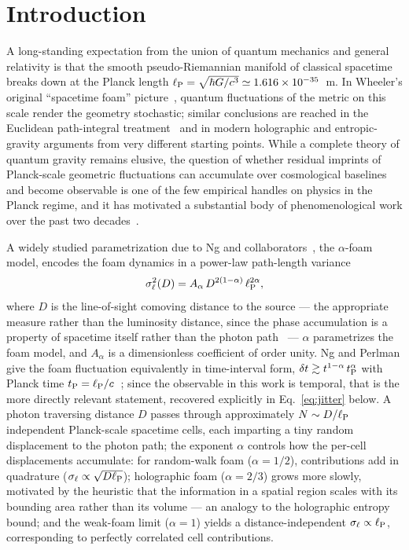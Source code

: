 \documentclass[aps,prd,onecolumn,amsmath,amssymb]{revtex4-2}
\begin{document}
\maketitle

\section{Introduction}
\label{sec:intro}

A long-standing expectation from the union of quantum mechanics and general
relativity is that the smooth pseudo-Riemannian manifold of classical spacetime
breaks down at the Planck length
$\ell_{\rm P} = \sqrt{\hbar G/c^3} \simeq 1.616\times 10^{-35}$~m.
In Wheeler's original ``spacetime foam'' picture~\cite{Wheeler1955}, quantum
fluctuations of the metric on this scale render the geometry stochastic;
similar conclusions are reached in the Euclidean path-integral
treatment~\cite{Hawking1978} and in modern holographic and entropic-gravity
arguments from very different starting points.
While a complete theory of quantum gravity remains elusive, the question of
whether residual imprints of Planck-scale geometric fluctuations can accumulate
over cosmological baselines and become observable is one of the few empirical
handles on physics in the Planck regime, and it has motivated a substantial
body of phenomenological work over the past two
decades~\cite{Carlip2023,NgPerlman2022}.

A widely studied parametrization due to Ng and
collaborators~\cite{Ng2001,Ng2003,NgPerlman2022}, the $\alpha$-foam model,
encodes the foam dynamics in a power-law path-length variance
\begin{equation}
  \sigma_\ell^2(D) = A_\alpha\,D^{2(1-\alpha)}\,\ell_{\rm P}^{2\alpha},
  \label{eq:NgPerlmanVar}
\end{equation}
where $D$ is the line-of-sight comoving distance to the source --- the
appropriate measure rather than the luminosity distance, since the phase
accumulation is a property of spacetime itself rather than the photon
path~\cite{NgPerlman2022} --- $\alpha$ parametrizes the foam model, and
$A_\alpha$ is a dimensionless coefficient of order unity.
Ng and Perlman give the foam fluctuation equivalently in time-interval form,
$\delta t \gtrsim t^{1-\alpha}\,t_{\rm P}^{\alpha}$ with Planck time
$t_{\rm P}=\ell_{\rm P}/c$~\cite{NgPerlman2022}; since the observable in this work
is temporal, that is the more directly relevant statement, recovered explicitly
in Eq.~\eqref{eq:jitter} below.
A photon traversing distance $D$ passes through approximately
$N \sim D/\ell_{\rm P}$ independent Planck-scale spacetime cells, each imparting
a tiny random displacement to the photon path; the exponent $\alpha$ controls
how the per-cell displacements accumulate: for random-walk foam ($\alpha=1/2$),
contributions add in quadrature ($\sigma_\ell \propto \sqrt{D\ell_{\rm P}}$);
holographic foam ($\alpha=2/3$) grows more slowly, motivated by the heuristic
that the information in a spatial region scales with its bounding area rather
than its volume --- an analogy to the holographic entropy bound;
and
the weak-foam limit ($\alpha=1$) yields a distance-independent
$\sigma_\ell \propto \ell_{\rm P}$, corresponding to perfectly correlated cell
contributions.
\end{document}
